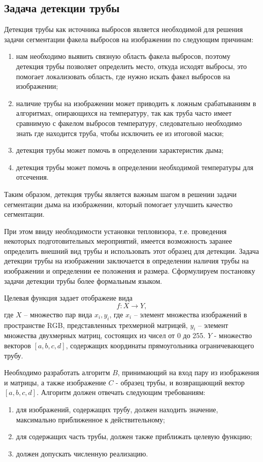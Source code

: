 \documentclass[14pt, a4paper]{extreport}
\begin{document}
\subsection{Задача детекции трубы}
	Детекция трубы как источника выбросов является необходимой для решения задачи сегментации факела выбросов на изображении по следующим причинам:
	\begin{enumerate}[label={\arabic*)}]
		\item нам необходимо выявить связную область факела выбросов, поэтому детекция трубы позволяет определить место, откуда исходят выбросы, это помогает локализовать область, где нужно искать факел выбросов на изображении;
		\item наличие трубы на изображении может приводить к ложным срабатываниям в алгоритмах, опирающихся на температуру, так как труба часто имеет сравнимую с факелом выбросов температуру, следовательно необходимо знать где находится труба, чтобы исключить ее из итоговой маски;
		\item детекция трубы может помочь в определении характеристик дыма; 
		\item детекция трубы может помочь в определении необходимой температуры для отсечения. 
	\end{enumerate}
	Таким образом, детекция трубы является важным шагом в решении задачи сегментации дыма на изображении, который помогает улучшить качество сегментации.
	
	При этом ввиду необходимости установки тепловизора, т.е. проведения некоторых подготовительных мероприятий, имеется возможность заранее определить внешний вид трубы и использовать этот образец для детекции. Задача детекции трубы на изображении заключается в определении наличия трубы на изображении и определении ее положения и размера. Сформулируем постановку задачи детекции трубы более формальным языком.
	
	Целевая функция задает отображеие вида
	\begin{equation}
		f : X \rightarrow Y,
		\label{f:x->[4]}
	\end{equation}
	где $X$ -- множество пар вида $x_i, y_i$, где $x_i$ -- элемент множества изображений в пространстве RGB, представленных трехмерной матрицей, $y_i$ -- элемент множества двухмерных матриц, состоящих из чисел от 0 до 255. $Y$ - множество векторов $[a, b, c, d]$, содержащих координаты прямоугольника ограничевающего трубу. 
	
	Необходимо разработать алгоритм $B$, принимающий на вход пару из изображения и матрицы, а также изображение $C$ - образец трубы, и возвращающий вектор $[a, b, c, d]$. Алгоритм должен отвечать следующим требованиям:
	\begin{enumerate}[label={\arabic*)}]
		\item для изображений, содержащих трубу, должен находить значение, максимально приближенное к действительному;
		\item для содержащих часть трубы, должен также приближать целевую функцию;
		\item должен допускать численную реализацию.
	\end{enumerate}
	
\end{document}
